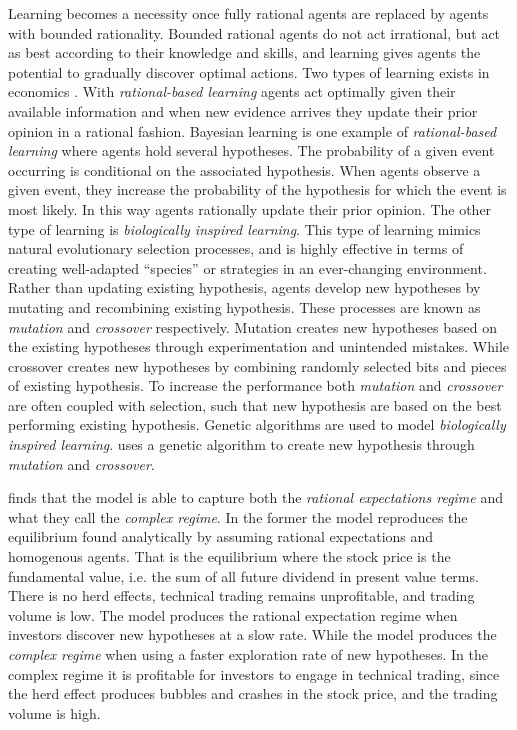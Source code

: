 \documentclass[preprint, 12pt]{elsarticle}
\begin{document}
Learning becomes a necessity once fully rational agents are replaced by agents with bounded rationality. Bounded rational agents do not act irrational, but act as best according to their knowledge and skills, and learning gives agents the potential to gradually discover optimal actions. Two types of learning exists in economics \citep[chapter~4]{Ehrentreich_2007}. With \emph{rational-based learning} agents act optimally given their available information and when new evidence arrives they update their prior opinion in a rational fashion. Bayesian learning is one example of \emph{rational-based learning} where agents hold several hypotheses. The probability of a given event occurring is conditional on the associated hypothesis. When agents observe a given event, they increase the probability of the hypothesis for which the event is most likely. In this way agents rationally update their prior opinion. The other type of learning is \emph{biologically inspired learning}. This type of learning mimics natural evolutionary selection processes, and is highly effective in terms of creating well-adapted ``species'' or strategies in an ever-changing environment. Rather than updating existing hypothesis, agents develop new hypotheses by mutating and recombining existing hypothesis. These processes are known as \emph{mutation} and \emph{crossover} respectively. Mutation creates new hypotheses based on the existing hypotheses through experimentation and unintended mistakes. While crossover creates new hypotheses by combining randomly selected bits and pieces of existing hypothesis. To increase the performance both \emph{mutation} and \emph{crossover} are often coupled with selection, such that new hypothesis are based on the best performing existing hypothesis. Genetic algorithms are used to model \emph{biologically inspired learning}. \citet[chapter~3]{Arthur_2014} uses a genetic algorithm to create new hypothesis through \emph{mutation} and \emph{crossover}.

\citet[chapter~3]{Arthur_2014} finds that the model is able to capture both the \emph{rational expectations regime} and what they call the \emph{complex regime}. In the former the model reproduces the equilibrium found analytically by assuming rational expectations and homogenous agents. That is the equilibrium where the stock price is the fundamental value, i.e. the sum of all future dividend in present value terms. There is no herd effects, technical trading remains unprofitable, and trading volume is low. The model produces the rational expectation regime when investors discover new hypotheses at a slow rate. While the model produces the \emph{complex regime} when using a faster exploration rate of new hypotheses. In the complex regime it is profitable for investors to engage in technical trading, since the herd effect produces bubbles and crashes in the stock price, and the trading volume is high. 
\end{document}
